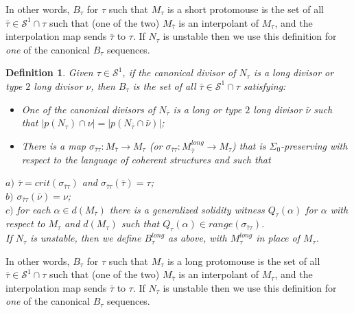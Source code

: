 \documentclass[12pt]{article}
\newtheorem{defn}[thm]{Definition}
\begin{document}
In other words, $B_\tau$ for $\tau$ such that $M_\tau$ is a short protomouse is the set of all $\bar{\tau} \in \mathcal{S}^1 \cap \tau$ such that (one of the two) $M_{\bar{\tau}}$ is an interpolant of $M_\tau$, and the interpolation map sends $\bar{\tau}$ to $\tau$.  If $N_\tau$ is unstable then we use this definition for \textit{one} of the canonical $B_\tau$ sequences.\\


\begin{defn} \label{long B-tau sequence on S^1}
Given $\tau \in \mathcal{S}^1$, if the canonical divisor of $N_\tau$ is a long divisor or type $2$ long divisor $\nu$, then $B_\tau$ is the set of all $\bar{\tau} \in \mathcal{S}^1 \cap \tau$ satisfying:

\begin{itemize}
\item{One of the canonical divisors of $N_{\bar{\tau}}$ is a long or type $2$ long divisor $\bar{\nu}$ such that $|p(N_\tau) \cap \nu| = |p(N_{\bar{\tau}} \cap \bar{\nu} )|$;}
\item{There is a map $\sigma_{\bar{\tau} \tau } : M_{\bar{\tau}} \longrightarrow M_\tau$ (or $\sigma_{\bar{\tau} \tau } : M_{\bar{\tau}}^{long} \longrightarrow M_\tau$) that is $\Sigma_0$-preserving with respect to the language of coherent structures and such that}
\end{itemize}

\indent \indent $a)$ $\bar{\tau} = crit (\sigma_{\bar{\tau} \tau })$ and $\sigma_{\bar{\tau} \tau } (\bar{\tau}) = \tau $;\\

\indent \indent $b)$ $\sigma_{\bar{\tau} \tau } (\bar{\nu}) = \nu$;\\

\indent \indent $c)$ for each $\alpha \in d(M_{\bar{\tau}})$ there is a generalized solidity witness $Q_\tau (\alpha )$ for $\alpha$ with respect to $M_\tau$ and $d(M_\tau)$ such that $Q_\tau (\alpha ) \in range ( \sigma_{\bar{\tau} \tau } )$.\\

If $N_\tau$ is unstable, then we define $B_\tau^{long}$ as above, with $M_\tau^{long}$ in place of $M_\tau$.



\end{defn}


In other words, $B_\tau$ for $\tau$ such that $M_\tau$ is a long protomouse is the set of all $\bar{\tau} \in \mathcal{S}^1 \cap \tau$ such that (one of the two) $M_{\bar{\tau}}$ is an interpolant of $M_\tau$, and the interpolation map sends $\bar{\tau}$ to $\tau$.  If $N_\tau$ is unstable then we use this definition for \textit{one} of the canonical $B_\tau$ sequences.\\
\end{document}
